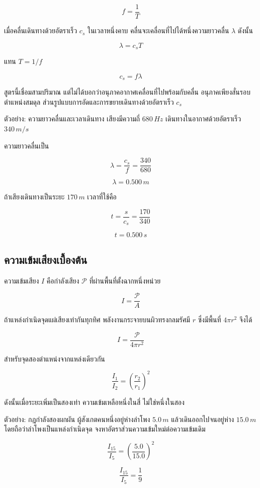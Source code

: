 \[
\boxed{f=\frac{1}{T}}
\]

เมื่อคลื่นเดินทางด้วยอัตราเร็ว $c_s$ ในเวลาหนึ่งคาบ คลื่นจะเคลื่อนที่ไปได้หนึ่งความยาวคลื่น $\lambda$ ดังนั้น

\[
\lambda=c_sT
\]

แทน $T=1/f$

\begin{tcolorbox}[title={ความสัมพันธ์พื้นฐานของคลื่นเสียง}]
\[
\boxed{c_s=f\lambda}
\]
\end{tcolorbox}

สูตรนี้เชื่อมสามปริมาณ แต่ไม่ได้บอกว่าอนุภาคอากาศเคลื่อนที่ไปพร้อมกับคลื่น อนุภาคเพียงสั่นรอบตำแหน่งสมดุล ส่วนรูปแบบการอัดและการขยายเดินทางด้วยอัตราเร็ว $c_s$

\begin{examplebox}{ตัวอย่าง: ความยาวคลื่นและเวลาเดินทาง}
เสียงมีความถี่ $680\,\si{Hz}$ เดินทางในอากาศด้วยอัตราเร็ว $340\,\si{m/s}$

ความยาวคลื่นเป็น

\[
\lambda=\frac{c_s}{f}
=\frac{340}{680}
\]

\[
\boxed{\lambda=0.500\,\si{m}}
\]

ถ้าเสียงเดินทางเป็นระยะ $170\,\si{m}$ เวลาที่ใช้คือ

\[
t=\frac{s}{c_s}
=\frac{170}{340}
\]

\[
\boxed{t=0.500\,\si{s}}
\]
\end{examplebox}

\subsection{ความเข้มเสียงเบื้องต้น}

ความเข้มเสียง $I$ คือกำลังเสียง $\mathcal P$ ที่ผ่านพื้นที่ตั้งฉากหนึ่งหน่วย

\[
\boxed{I=\frac{\mathcal P}{A}}
\]

ถ้าแหล่งกำเนิดจุดแผ่เสียงเท่ากันทุกทิศ พลังงานกระจายบนผิวทรงกลมรัศมี $r$ ซึ่งมีพื้นที่ $4\pi r^2$ จึงได้

\begin{tcolorbox}[title={ความเข้มจากแหล่งกำเนิดจุด}]
\[
\boxed{I=\frac{\mathcal P}{4\pi r^2}}
\]

สำหรับจุดสองตำแหน่งจากแหล่งเดียวกัน

\[
\boxed{\frac{I_1}{I_2}=\left(\frac{r_2}{r_1}\right)^2}
\]
\end{tcolorbox}

ดังนั้นเมื่อระยะเพิ่มเป็นสองเท่า ความเข้มเหลือหนึ่งในสี่ ไม่ใช่หนึ่งในสอง

\begin{examplebox}{ตัวอย่าง: กฎกำลังสองผกผัน}
ผู้สังเกตคนหนึ่งอยู่ห่างลำโพง $5.0\,\si{m}$ แล้วเดินออกไปจนอยู่ห่าง $15.0\,\si{m}$ โดยถือว่าลำโพงเป็นแหล่งกำเนิดจุด จงหาอัตราส่วนความเข้มใหม่ต่อความเข้มเดิม

\[
\frac{I_{15}}{I_5}
=\left(\frac{5.0}{15.0}\right)^2
\]

\[
\boxed{\frac{I_{15}}{I_5}=\frac{1}{9}}
\]
\end{examplebox}

